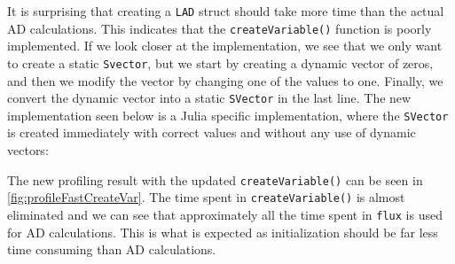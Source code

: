 It is surprising that creating a \texttt{LAD} struct should take more time than the actual AD calculations. This indicates that the \texttt{createVariable()} function is poorly implemented. If we look closer at the implementation, we see that we only want to create a static \texttt{Svector}, but we start by creating a dynamic vector of zeros, and then we modify the vector by changing one of the values to one. Finally, we convert the dynamic vector into a static \texttt{SVector} in the last line. The new implementation seen below is a Julia specific implementation, where the \texttt{SVector} is created immediately with correct values and without any use of dynamic vectors:

The new profiling result with the updated \texttt{createVariable()} can be seen in \autoref{fig:profileFastCreateVar}. The time spent in \texttt{createVariable()} is almost eliminated and we can see that approximately all the time spent in \texttt{flux} is used for AD calculations. This is what is expected as initialization should be far less time consuming than AD calculations. 


